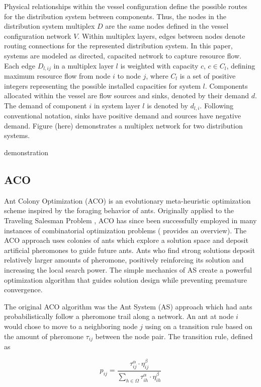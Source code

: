 \documentclass[preprint,12pt]{elsarticle}
\begin{document}
Physical relationships within the vessel configuration define the possible routes for the distribution system between components. Thus, the nodes in the distribution system multiplex $D$ are the same nodes defined in the vessel configuration network $V$. Within multiplex layers, edges between nodes denote routing connections for the represented distribution system. In this paper, systems are modeled as directed, capacited network to capture resource flow. Each edge $D_{l,ij}$ in a multiplex layer $l$ is weighted with capacity $c$, $c \in C_l$, defining maximum resource flow from node $i$ to node $j$, where $C_l$ is a set of positive integers representing the possible installed capacities for system $l$. Components allocated within the vessel are flow sources and sinks, denoted by their demand $d$. The demand of component $i$ in system layer $l$ is denoted by $d_{l,i}$. Following conventional notation, sinks have positive demand and sources have negative demand. Figure (here) demonstrates a multiplex network for two distribution systems.

demonstration



\subsection{ACO} \label{sec:ACO}
Ant Colony Optimization (ACO) is an evolutionary meta-heuristic optimization scheme inspired by the foraging behavior of ants. Originally applied to the Traveling Salesman Problem \citep{Dorigo1996}, ACO has since been successfully employed in many instances of combinatorial optimization problems (\cite{Dorigo1999} provides an overview). The ACO approach uses colonies of ants which explore a solution space and deposit artificial pheromones to guide future ants. Ants who find strong solutions deposit relatively larger amounts of pheromone, positively reinforcing its solution and increasing the local search power. The simple mechanics of AS create a powerful optimization algorithm that guides solution design while preventing premature convergence. 

The original ACO algorithm was the Ant System (AS) approach \citep{Dorigo1996} which had ants probabilistically follow a pheromone trail along a network. An ant at node $i$ would chose to move to a neighboring node $j$ using on a transition rule based on the amount of pheromone $\tau_{ij}$ between the node pair. The transition rule, defined as 

\begin{equation}
p_{ij}=\frac{\tau_{ij}^\alpha\cdot\eta_{ij}^\beta}{\sum_{h\in\Omega}
	\tau_{ih}^\alpha\cdot\eta_{ih}^\beta}
\label{eq:AStrans}
\end{equation}
\end{document}
